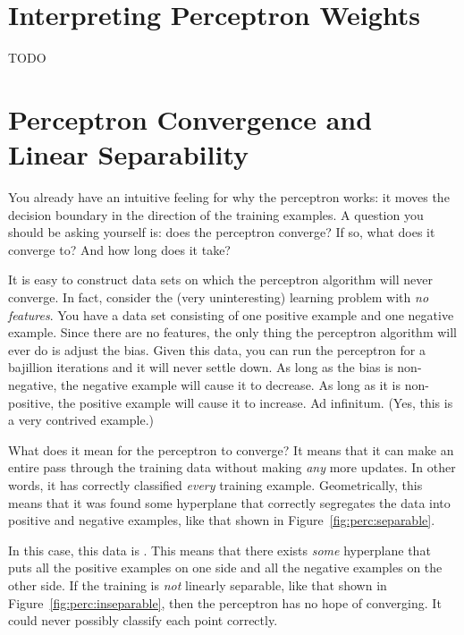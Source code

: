 \section{Interpreting Perceptron Weights}

TODO

\section{Perceptron Convergence and Linear Separability}

You already have an intuitive feeling for why the perceptron works: it
moves the decision boundary in the direction of the training
examples.  A question you should be asking yourself is: does the
perceptron converge?  If so, what does it converge to?  And how long
does it take?

It is easy to construct data sets on which the perceptron algorithm
will never converge.  In fact, consider the (very uninteresting)
learning problem with \emph{no features}.  You have a data set
consisting of one positive example and one negative example.  Since
there are no features, the only thing the perceptron algorithm will
ever do is adjust the bias.  Given this data, you can run the
perceptron for a bajillion iterations and it will never settle down.
As long as the bias is non-negative, the negative example will cause
it to decrease.  As long as it is non-positive, the positive example
will cause it to increase.  Ad infinitum.  (Yes, this is a very
contrived example.)


What does it mean for the perceptron to converge?  It means that it
can make an entire pass through the training data without making
\emph{any} more updates.  In other words, it has correctly classified
\emph{every} training example.  Geometrically, this means that it was
found some hyperplane that correctly segregates the data into positive
and negative examples, like that shown in
Figure~\ref{fig:perc:separable}.


In this case, this data is .  This means
that there exists \emph{some} hyperplane that puts all the positive
examples on one side and all the negative examples on the other side.
If the training is \emph{not} linearly separable, like that shown in
Figure~\ref{fig:perc:inseparable}, then the perceptron has no hope of
converging.  It could never possibly classify each point correctly.

